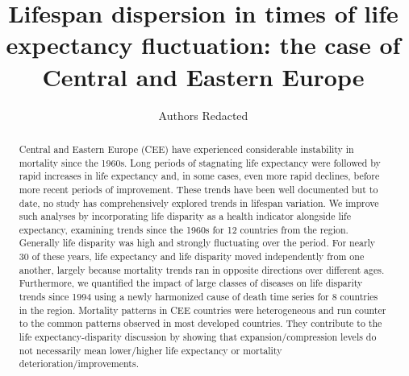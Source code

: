 \documentclass{article}
\title{Lifespan dispersion in times of life expectancy fluctuation: the case of Central and Eastern Europe}
\author[]{Authors Redacted}
\date{}
\begin{document}
\maketitle

\begin{abstract}
Central and Eastern Europe (CEE) have experienced considerable instability in mortality since the 1960s. Long periods of stagnating life expectancy were followed by rapid increases in life expectancy and, in some cases, even more rapid declines, before more recent periods of improvement. These trends have been well documented but to date, no study has comprehensively explored trends in lifespan variation.  We improve such analyses by incorporating life disparity as a health indicator alongside life expectancy, examining trends since the 1960s for 12 countries from the region. Generally life disparity was high and strongly fluctuating over the period. For nearly 30 of these years, life expectancy and life disparity moved independently from one another, largely because mortality trends ran in opposite directions over different ages. Furthermore, we quantified the impact of large classes of diseases on life disparity trends since 1994 using a newly harmonized cause of death time series for 8 countries in the region. Mortality patterns in CEE countries were heterogeneous and run counter to the common patterns observed in most developed countries. They contribute to the life expectancy-disparity discussion by showing that expansion/compression levels do not necessarily mean lower/higher life expectancy or mortality deterioration/improvements.
\end{abstract}


\newpage
\end{document}
